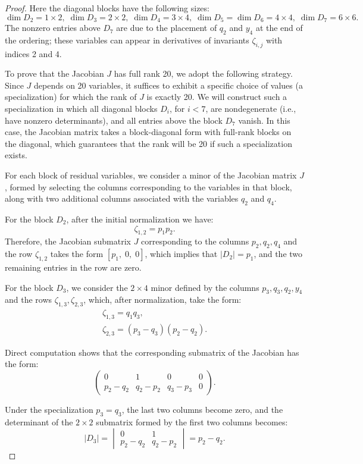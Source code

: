 \documentclass[12pt,reqno]{amsart}
\begin{document}
\begin{proof}
\smallskip\noindent
Here the diagonal blocks have the following sizes:
\[
\dim D_2=1\times 2,\;
\dim D_3=2\times 2,\;
\dim D_4=3\times 4,\;
\dim D_5=\dim D_6=4\times4,\;
\dim D_7=6\times 6.
\]
The nonzero entries above \(D_7\) are due to the placement of \(q_2\) and \(y_4\) at the end of the ordering; these variables can appear in derivatives of invariants \(\zeta_{i,j}\) with indices 2 and 4.


To prove that the Jacobian \(J\) has full rank 20, we adopt the following strategy. Since \(J\) depends on 20 variables, it suffices to exhibit a specific choice of values (a specialization) for which the rank of \(J\) is exactly 20. We will construct such a specialization in which all diagonal blocks \(D_i\), for \(i < 7\), are nondegenerate (i.e., have nonzero determinants), and all entries above the block \(D_7\) vanish. In this case, the Jacobian matrix takes a block-diagonal form with full-rank blocks on the diagonal, which guarantees that the rank will be 20 if such a specialization exists.


For each block of residual variables, we consider a minor of the Jacobian matrix \(J\), formed by selecting the columns corresponding to the variables in that block, along with two additional columns associated with the variables \(q_2\) and \(q_4\).


For the block \(D_2\), after the initial normalization we have:
\[
\zeta_{1,2} = p_1 p_2.
\]
Therefore, the Jacobian submatrix \(J\) corresponding to the columns \(p_2, q_2, q_4\) and the row \(\zeta_{1,2}\) takes the form \([p_1,\; 0,\; 0]\), which implies that \(|D_2| = p_1\), and the two remaining entries in the row are zero.

For the block \(D_3\), we consider the \(2 \times 4\) minor defined by the columns \(p_3, q_3, q_2, y_4\) and the rows \(\zeta_{1,3}, \zeta_{2,3}\), which, after normalization, take the form:
\begin{gather*}
\zeta_{1,3} = q_1 q_3,\\
\zeta_{2,3} = (p_3 - q_3)(p_2 - q_2).
\end{gather*}

Direct computation shows that the corresponding submatrix of the Jacobian has the form:
\[
\left(
\begin{array}{cccc}
0 & 1 & 0 & 0 \\
p_2 - q_2 &  q_2-p_2  &  q_3-p_3  & 0
\end{array}
\right).
\]

Under the specialization \(p_3 = q_3\), the last two columns become zero, and the determinant of the \(2 \times 2\) submatrix formed by the first two columns becomes:
\[
|D_3| =
\begin{vmatrix}
0 & 1 \\
p_2 - q_2 & q_2-p_2 
\end{vmatrix}
= p_2 - q_2.
\]


\end{proof}
\end{document}
